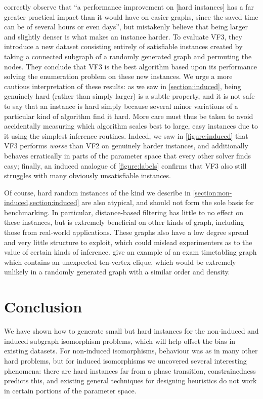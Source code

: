 \documentclass[twoside,11pt]{article}
\newcommand{\citet}[1]{\citeA{#1}}
\newcommand{\citep}[1]{\cite{#1}}
\begin{document}
\citet{o:CarlettiFSV17} correctly observe that ``a performance improvement on [hard instances] has a
far greater practical impact than it would have on easier graphs, since the saved time can be of
several hours or even days'', but mistakenly believe that being larger and slightly denser is what
makes an instance harder. To evaluate VF3, they introduce a new dataset consisting entirely of
satisfiable instances created by taking a connected subgraph of a randomly generated graph and
permuting the nodes. They conclude that VF3 is the best algorithm based upon its performance solving
the enumeration problem on these new instances.  We urge a more cautious interpretation of these
results: as we saw in \cref{section:induced}, being genuinely hard (rather than simply larger) is a
subtle property, and it is not safe to say that an instance is hard simply because several
minor variations of a particular kind of algorithm find it hard. More care must thus be taken to
avoid accidentally measuring which algorithm scales best to large, easy instances due to it using
the simplest inference routines. Indeed, we saw in \cref{figure:induced} that VF3 performs
\emph{worse} than VF2 on genuinely harder instances, and additionally behaves erratically in parts
of the parameter space that every other solver finds easy; finally, an induced analogue of
\cref{figure:labels} confirms that VF3 also still struggles with many obviously unsatisfiable
instances.

Of course, hard random instances of the kind we describe in
\cref{section:non-induced,section:induced} are also atypical, and should not form the sole basis for
benchmarking. In particular, distance-based filtering
\citep{DBLP:conf/cp/AudemardLMGP14,DBLP:conf/cp/McCreeshP15,DBLP:conf/lion/KotthoffMS16} has little
to no effect on these instances, but is extremely beneficial on other kinds of graph, including
those from real-world applications.  These graphs also have a low degree spread and very little
structure to exploit, which could mislead experimenters as to the value of certain kinds of
inference. \citet{o:GentW95} give an example of an exam timetabling graph which contains an
unexpected ten-vertex clique, which would be extremely unlikely in a randomly generated graph with a
similar order and density.

\section{Conclusion}

We have shown how to generate small but hard instances for the non-induced and induced subgraph
isomorphism problems, which will help offset the bias in existing datasets. For non-induced
isomorphisms, behaviour was as in many other hard problems, but for induced isomorphisms we
uncovered several interesting phenomena: there are hard instances far from a phase transition,
constrainedness predicts this, and existing general techniques for designing heuristics do not work
in certain portions of the parameter space.
\end{document}

